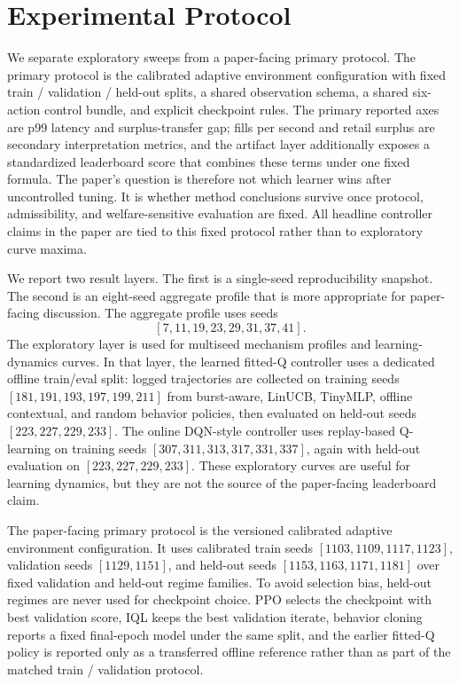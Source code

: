 \documentclass[11pt]{article}
\begin{document}
\section{Experimental Protocol}
We separate exploratory sweeps from a paper-facing primary protocol. The primary protocol is the calibrated adaptive environment configuration with fixed train / validation / held-out splits, a shared observation schema, a shared six-action control bundle, and explicit checkpoint rules. The primary reported axes are p99 latency and surplus-transfer gap; fills per second and retail surplus are secondary interpretation metrics, and the artifact layer additionally exposes a standardized leaderboard score that combines these terms under one fixed formula. The paper's question is therefore not which learner wins after uncontrolled tuning. It is whether method conclusions survive once protocol, admissibility, and welfare-sensitive evaluation are fixed. All headline controller claims in the paper are tied to this fixed protocol rather than to exploratory curve maxima.

We report two result layers. The first is a single-seed reproducibility snapshot. The second is an eight-seed aggregate profile that is more appropriate for paper-facing discussion. The aggregate profile uses seeds
\[
[7, 11, 19, 23, 29, 31, 37, 41].
\]
The exploratory layer is used for multiseed mechanism profiles and learning-dynamics curves. In that layer, the learned fitted-Q controller uses a dedicated offline train/eval split: logged trajectories are collected on training seeds $[181, 191, 193, 197, 199, 211]$ from burst-aware, LinUCB, TinyMLP, offline contextual, and random behavior policies, then evaluated on held-out seeds $[223, 227, 229, 233]$. The online DQN-style controller uses replay-based Q-learning on training seeds $[307, 311, 313, 317, 331, 337]$, again with held-out evaluation on $[223, 227, 229, 233]$. These exploratory curves are useful for learning dynamics, but they are not the source of the paper-facing leaderboard claim.

The paper-facing primary protocol is the versioned calibrated adaptive environment configuration. It uses calibrated train seeds $[1103, 1109, 1117, 1123]$, validation seeds $[1129, 1151]$, and held-out seeds $[1153, 1163, 1171, 1181]$ over fixed validation and held-out regime families. To avoid selection bias, held-out regimes are never used for checkpoint choice. PPO selects the checkpoint with best validation score, IQL keeps the best validation iterate, behavior cloning reports a fixed final-epoch model under the same split, and the earlier fitted-Q policy is reported only as a transferred offline reference rather than as part of the matched train / validation protocol.
\end{document}
